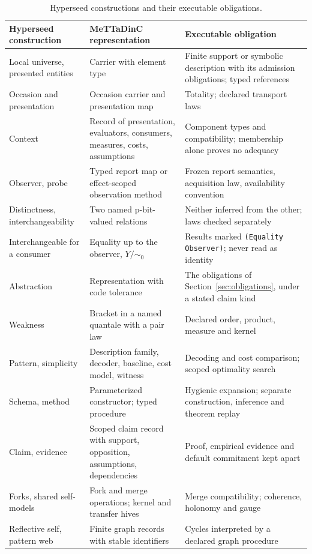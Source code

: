 \documentclass[11pt]{article}
\newcommand{\code}[1]{\texttt{#1}}
\theoremstyle{definition}
\theoremstyle{plain}
\begin{document}
\begin{table}[ht]
\centering\small
\begin{tabularx}{\textwidth}{>{\raggedright\arraybackslash}p{3.4cm}>{\raggedright\arraybackslash}X>{\raggedright\arraybackslash}X}
\toprule
Hyperseed construction & MeTTaDinC representation & Executable obligation\\
\midrule
Local universe, presented entities & Carrier with element type & Finite support or symbolic description with its admission obligations; typed references\\
Occasion and presentation & Occasion carrier and presentation map & Totality; declared transport laws\\
Context & Record of presentation, evaluators, consumers, measures, costs, assumptions & Component types and compatibility; membership alone proves no adequacy\\
Observer, probe & Typed report map or effect-scoped observation method & Frozen report semantics, acquisition law, availability convention\\
Distinctness, interchangeability & Two named p-bit-valued relations & Neither inferred from the other; laws checked separately\\
Interchangeable for a consumer & Equality up to the observer, $Y/{\sim_0}$ & Results marked \code{(Equality Observer)}; never read as identity\\
Abstraction & Representation with code tolerance & The obligations of Section~\ref{sec:obligations}, under a stated claim kind\\
Weakness & Bracket in a named quantale with a pair law & Declared order, product, measure and kernel\\
Pattern, simplicity & Description family, decoder, baseline, cost model, witness & Decoding and cost comparison; scoped optimality search\\
Schema, method & Parameterized constructor; typed procedure & Hygienic expansion; separate construction, inference and theorem replay\\
Claim, evidence & Scoped claim record with support, opposition, assumptions, dependencies & Proof, empirical evidence and default commitment kept apart\\
Forks, shared self-models & Fork and merge operations; kernel and transfer hives & Merge compatibility; coherence, holonomy and gauge\\
Reflective self, pattern web & Finite graph records with stable identifiers & Cycles interpreted by a declared graph procedure\\
\bottomrule
\end{tabularx}
\caption{Hyperseed constructions and their executable obligations.}
\end{table}
\end{document}
